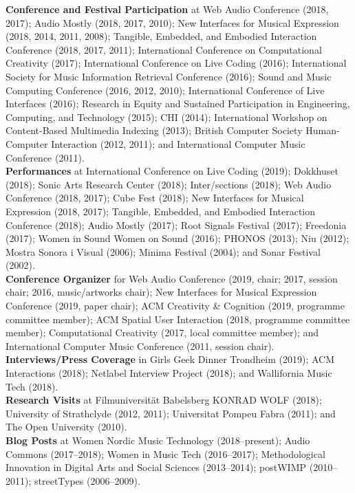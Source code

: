 \documentclass[10pt, a4paper]{article}
\begin{document}
{\textbf{Conference and Festival Participation}} at Web Audio Conference (2018, 2017); Audio Mostly (2018, 2017, 2010); New Interfaces for Musical Expression (2018, 2014, 2011, 2008); Tangible, Embedded, and Embodied Interaction Conference (2018, 2017, 2011); International Conference on Computational Creativity (2017); International Conference on Live Coding (2016); International Society for Music Information Retrieval Conference (2016); Sound and Music Computing Conference (2016, 2012, 2010); International Conference of Live Interfaces (2016); Research in Equity and Sustained Participation in Engineering, Computing, and Technology (2015); CHI (2014); International Workshop on Content-Based Multimedia Indexing (2013); British Computer Society Human-Computer Interaction (2012, 2011); and International Computer Music Conference (2011).\\

{\textbf{Performances}} at International Conference on Live Coding (2019); Dokkhuset (2018); Sonic Arts Research Center (2018); Inter/sections (2018); Web Audio Conference (2018, 2017); Cube Fest (2018); New Interfaces for Musical Expression (2018, 2017); Tangible, Embedded, and Embodied Interaction Conference (2018); Audio Mostly (2017); Root Signals Festival (2017); Freedonia (2017); Women in Sound Women on Sound (2016); PHONOS (2013); Niu (2012); Mostra Sonora i Visual (2006); Minima Festival (2004); and Sonar Festival (2002).\\

{\textbf{Conference Organizer}} for Web Audio Conference (2019, chair; 2017, session chair; 2016, music/artworks chair); New Interfaces for Musical Expression Conference (2019, paper chair); ACM Creativity \& Cognition (2019, programme committee member); ACM Spatial User Interaction (2018, programme committee member); Computational Creativity (2017, local committee member); and International Computer Music Conference (2011, session chair).\\

{\textbf{Interviews/Press Coverage}} in Girls Geek Dinner Trondheim (2019); ACM Interactions (2018); Netlabel Interview Project (2018); and Wallifornia Music Tech (2018).\\

{\textbf{Research Visits}} at Filmuniversität Babelsberg KONRAD WOLF (2018); University of Strathclyde (2012, 2011); Universitat Pompeu Fabra (2011); and The Open University (2010).\\

{\textbf{Blog Posts}} at Women Nordic Music Technology (2018--present); Audio Commons (2017--2018); Women in Music Tech (2016--2017); Methodological Innovation in Digital Arts and Social Sciences (2013--2014); postWIMP (2010--2011); streetTypes (2006--2009).\\
\end{document}
